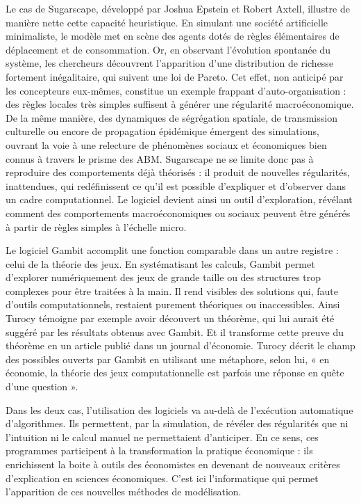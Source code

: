 Le cas de Sugarscape, développé par Joshua Epstein et Robert Axtell, illustre de manière nette cette capacité heuristique. En simulant une société artificielle minimaliste, le modèle met en scène des agents dotés de règles élémentaires de déplacement et de consommation. Or, en observant l’évolution spontanée du système, les chercheurs découvrent l’apparition d'une distribution de richesse fortement inégalitaire, qui suivent une loi de Pareto. Cet effet, non anticipé par les concepteurs eux-mêmes, constitue un exemple frappant d’auto-organisation : des règles locales très simples suffisent à générer une régularité macroéconomique. De la même manière, des dynamiques de ségrégation spatiale, de transmission culturelle ou encore de propagation épidémique émergent des simulations, ouvrant la voie à une relecture de phénomènes sociaux et économiques bien connus à travers le prisme des ABM. Sugarscape ne se limite donc pas à reproduire des comportements déjà théorisés : il produit de nouvelles régularités, inattendues, qui redéfinissent ce qu’il est possible d’expliquer et d’observer dans un cadre computationnel. Le logiciel devient ainsi un outil d’exploration, révélant comment des comportements macroéconomiques ou sociaux peuvent être générés à partir de règles simples à l'échelle micro.

Le logiciel Gambit accomplit une fonction comparable dans un autre registre : celui de la théorie des jeux. En systématisant les calculs, Gambit permet d’explorer numériquement des jeux de grande taille ou des structures trop complexes pour être traitées à la main. Il rend visibles des solutions qui, faute d’outils computationnels, restaient purement théoriques ou inaccessibles. Ainsi Turocy témoigne par exemple avoir découvert un théorème, qui lui aurait été suggéré par les résultats obtenus avec Gambit. Et il transforme cette preuve du théorème en un article publié dans un journal d'économie. Turocy décrit le champ des possibles ouverts par Gambit en utilisant une métaphore, selon lui, « en économie, la théorie des jeux computationnelle est parfois une réponse en quête d’une question ». 

Dans les deux cas, l’utilisation des logiciels va au-delà de l’exécution automatique d’algorithmes. Ils permettent, par la simulation, de révéler des régularités que ni l’intuition ni le calcul manuel ne permettaient d'anticiper. En ce sens, ces programmes participent à la transformation la pratique économique : ils enrichissent la boite à outils des économistes en devenant de nouveaux critères d’explication en sciences économiques. C'est ici l'informatique qui permet l'apparition de ces nouvelles méthodes de modélisation.

